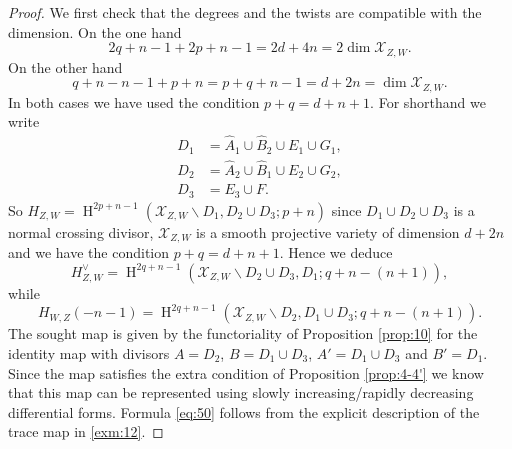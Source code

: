 \documentclass[11pt,a4paper]{amsart}
\newcommand{\caX}{\mathcal{X}}
\DeclareMathOperator{\rH}{H}
\numberwithin{equation}{section}
\theoremstyle{plain}
\theoremstyle{definition}
\begin{document}
  \begin{proof}
    We first check that the degrees and the twists are compatible with
    the dimension. On the
    one hand
    \begin{displaymath}
      2q+n-1+2p+n-1=2d+4n=2\dim \caX_{Z,W}.
    \end{displaymath}
    On the other hand
    \begin{displaymath}
      q+n -n-1 +p+n=p+q+n-1=d+2n= \dim \caX_{Z,W}.
    \end{displaymath}
    In both cases we have used the condition $p+q=d+n+1$.
    For shorthand  we write
    \begin{align*}
      D_{1}&=\widehat A_1\cup
    \widehat B_2\cup E_1\cup G_1,\\
      D_{2}&=\widehat A_2\cup
             \widehat B_1\cup E_2\cup G_2,\\
      D_{3}&=E_{3}\cup F.
    \end{align*}
    So $H_{Z,W}=\rH^{2p+n-1}(\caX_{Z,W}\smallsetminus D_1  , D_2\cup
    D_3;p+n)$
    since $D_{1}\cup D_{2}\cup D_{3}$ is a normal crossing divisor,
    $\caX_{Z,W}$  is a smooth projective variety of dimension 
    $d+2n$ and  we
    have the condition 
    \begin{math}
      p+q=d+n+1.
    \end{math}
    Hence we deduce
    \begin{displaymath}
      H_{Z,W}^{\vee}=\rH^{2q+n-1}(\caX_{Z,W}\smallsetminus D_2 \cup
    D_3 , D_1;q+n-(n+1)),
  \end{displaymath}
  while
      \begin{displaymath}
      H_{W,Z}(-n-1)=\rH^{2q+n-1}(\caX_{Z,W}\smallsetminus D_2  , D_1\cup
    D_3;q+n-(n+1)).
  \end{displaymath}
  The sought map is given by the functoriality of Proposition
  \ref{prop:10} for the identity map with divisors $A=D_{2}$,
  $B=D_{1}\cup D_{3}$, $A'=D_{1}\cup D_{3}$ and $B'=D_{1}$. Since the
  map satisfies the extra condition of
  Proposition \ref{prop:4-4'} we know that this map can be represented
  using slowly increasing/rapidly decreasing 
    differential forms. Formula \eqref{eq:50} follows from the
    explicit description of the trace map in \ref{exm:12}.
  \end{proof}
\end{document}
